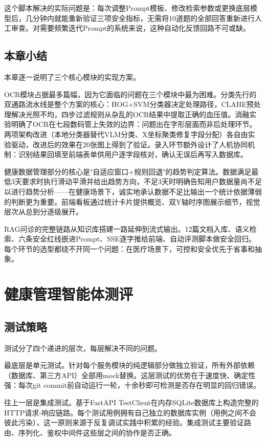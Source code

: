 \documentclass[zihao=-4,a4paper]{ctexart}
\numberwithin{figure}{section}
\numberwithin{table}{section}
\begin{document}
这个脚本解决的实际问题是：每次调整Prompt模板、修改检索参数或更换底层模型后，几分钟内就能重新验证三项安全指标，无需将10道题的全部回答重新进行人工审查。对需要频繁迭代Prompt的系统来说，这种自动化反馈回路不可或缺。

\subsection{本章小结}

本章逐一说明了三个核心模块的实现方案。

OCR模块占据最多篇幅，因为它面临的问题在三个模块中最为困难。分类先行的双通路流水线是整个方案的核心：HOG+SVM分类器决定处理路径，CLAHE预处理解决光照不均，四步过滤规则从杂乱的OCR结果中提取正确的血压值。消融实验明确了OCR在七段数码管上失效的边界：问题出在字形层面而非后处理环节。两项架构改进（本地分类器替代VLM分类、X坐标聚类修复字段分配）各自由实验驱动，改进后的效果在20张图上得到了验证。录入环节额外设计了人机协同机制：识别结果回填至前端表单供用户逐字段核对，确认无误后再写入数据库。

健康数据管理部分的核心是"自适应窗口+规则回退"的趋势判定算法。数据满足最低3天要求时执行滑动平滑并给出趋势方向，不足3天时明确告知用户数据量尚不足以进行趋势分析——在健康场景下，诚实地承认数据不足比输出一个统计依据薄弱的判断更为重要。前端看板通过统计卡片提供概览、双Y轴时序图展示细节，视觉层次从总到分逐级展开。

RAG问诊的完整链路从知识库搭建一路延伸到流式输出。12篇文档入库、语义检索、六条安全红线嵌进Prompt、SSE逐字推给前端、自动评测脚本做安全回归。每个环节的选型都绕不开同一个问题：在医疗场景下，可控和安全优先于省事和抽象。

\newpage
\section{健康管理智能体测评}

\subsection{测试策略}

测试分了四个递进的层次，每层解决不同的问题。

最底层是单元测试。针对每个服务模块的纯逻辑部分做独立验证，所有外部依赖（数据库、第三方API）全部用mock替换。这层测试的优势在于速度快、确定性强：每次git commit前自动运行一轮，十余秒即可检测是否存在明显的回归错误。

往上一层是集成测试。基于FastAPI TestClient在内存SQLite数据库上构造完整的HTTP请求-响应链路。每个测试用例拥有自己独立的数据库实例（用例之间不会彼此污染），这一原则来源于反复调试实践中积累的经验。集成测试主要验证路由、序列化、鉴权中间件这些层之间的协作是否正确。
\end{document}
